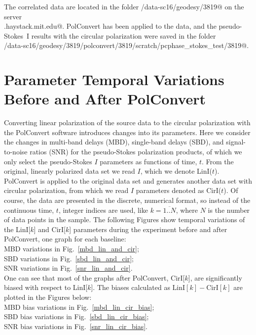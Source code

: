 \documentclass[letterpaper,twoside,12pt]{article}
\begin{document}
The correlated data are located in the folder \verb@/data-sc16/geodesy/3819@ on the server \\
\verb@demi.haystack.mit.edu@. PolConvert has been applied to the data, and the pseudo-Stokes~I results with the circular polarization were saved in the folder \\
\verb@/data-sc16/geodesy/3819/polconvert/3819/scratch/pcphase_stokes_test/3819@. \\



\section{Parameter Temporal Variations Before and After PolConvert}

Converting linear polarization of the source data to the circular polarization with the PolConvert software introduces changes into its parameters. Here we consider the changes in multi-band delays (MBD), single-band delays (SBD), and signal-to-noise ratios (SNR) for the pseudo-Stokes polarization products, of which we only select the pseudo-Stokes $I$ parameters as functions of time, $t$. From the original, linearly polarized data set we read $I$, which we denote LinI($t$). PolConvert is applied to the original data set and generates another data set with circular polarization, from which we read $I$ parameters denoted as CirI($t$). Of course, the data are presented in the discrete, numerical format, so instead of the continuous time, $t$, integer indices are used, like $k=\overline{1..N}$, where $N$ is the number of data points in the sample.  The following Figures show temporal variations of the LinI[$k$] and CirI[$k$] parameters during the experiment before and after PolConvert, one graph for each baseline:  \\


\indent MBD variations in Fig.~\ref{mbd_lin_and_cir};  \\
\indent SBD variations in Fig.~\ref{sbd_lin_and_cir};  \\
\indent SNR variations in Fig.~\ref{snr_lin_and_cir}.  \\


One can see that most of the graphs after PolConvert, CirI[$k$], are significantly biased with respect to LinI[$k$]. The biases calculated as $\mathrm{LinI}[k] - \mathrm{CirI}[k]$ are plotted in the Figures below: \\

\indent MBD bias variations in Fig.~\ref{mbd_lin_cir_bias};  \\
\indent SBD bias variations in Fig.~\ref{sbd_lin_cir_bias};  \\
\indent SNR bias variations in Fig.~\ref{snr_lin_cir_bias}.  \\
\end{document}
